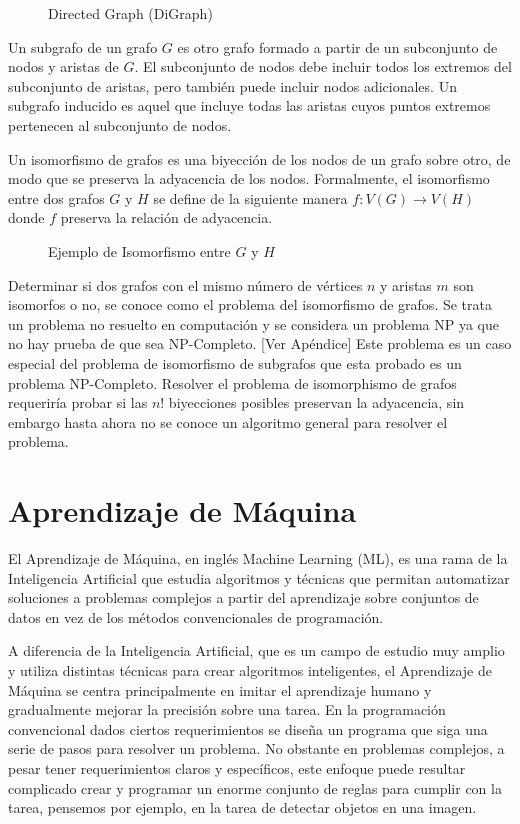  \begin{figure}[htbp]
   \centering
   
    \caption{Directed Graph (DiGraph)}
    \label{fig:graph}
\end{figure}

Un subgrafo de un grafo $G$ es otro grafo formado a partir de un subconjunto de nodos y aristas de $G$. El subconjunto de nodos debe incluir todos los extremos del subconjunto de aristas, pero también puede incluir nodos adicionales. Un subgrafo inducido es aquel que incluye todas las aristas cuyos puntos extremos pertenecen al subconjunto de nodos.

Un isomorfismo de grafos es una biyección de los nodos de un grafo sobre otro, de modo que se preserva la adyacencia de los nodos. Formalmente, el isomorfismo entre dos grafos $G$ y $H$ se define de la siguiente manera $f:V(G) \rightarrow V(H)$ donde $f$ preserva la relación de adyacencia.

 \begin{figure}[htbp]
   \centering
   
    \caption{Ejemplo de Isomorfismo entre $G$ y $H$}
    \label{fig:graph}
\end{figure}

Determinar si dos grafos con el mismo número de vértices $n$ y aristas $m$ son isomorfos o no, se conoce como el problema del isomorfismo de grafos. Se trata un problema no resuelto en computación y se considera un problema NP ya que no hay prueba de que sea NP-Completo. \cite{kobler_graph_1993} [Ver Apéndice] Este problema es un caso especial del problema de isomorfismo de subgrafos que esta probado es un problema NP-Completo. Resolver el problema de isomorphismo de grafos requeriría probar si las $n!$ biyecciones posibles preservan la adyacencia, sin embargo hasta ahora no se conoce un algoritmo general para resolver el problema. 


\section{Aprendizaje de Máquina}

El Aprendizaje de Máquina, en inglés Machine Learning (ML), es una rama de la Inteligencia Artificial que estudia algoritmos y técnicas que permitan automatizar soluciones a problemas complejos a partir del aprendizaje sobre conjuntos de datos en vez de los métodos convencionales de programación. 

A diferencia de la Inteligencia Artificial, que es un campo de estudio muy amplio y utiliza distintas técnicas para crear algoritmos inteligentes, el Aprendizaje de Máquina se centra principalmente en imitar el aprendizaje humano y gradualmente mejorar la precisión sobre una tarea. \cite{ibm_what_nodate} En la programación convencional dados ciertos requerimientos se diseña un programa que siga una serie de pasos para resolver un problema. No obstante en problemas complejos, a pesar tener requerimientos claros y específicos, este enfoque puede resultar complicado crear y programar un enorme conjunto de reglas para cumplir con la tarea, pensemos por ejemplo, en la tarea de detectar objetos en una imagen. \cite{rebala_introduction_2019}

